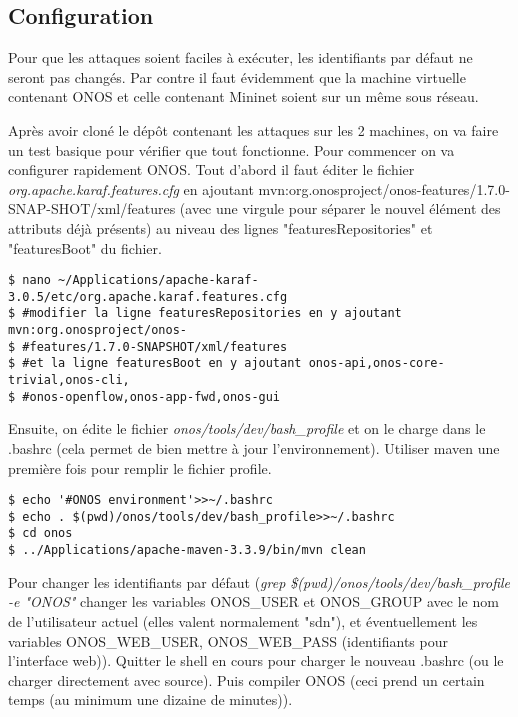 \subsection{Configuration}

Pour que les attaques soient faciles à exécuter, les identifiants par défaut ne seront pas changés. Par contre il faut évidemment que la machine virtuelle contenant ONOS et celle contenant Mininet soient sur un même sous réseau.

Après avoir cloné le dépôt contenant les attaques sur les 2 machines, on va faire un test basique pour vérifier que tout fonctionne. Pour commencer on va configurer rapidement ONOS. Tout d'abord il faut éditer le fichier \textit{org.apache.karaf.features.cfg} en ajoutant mvn:org.onosproject/onos-features/1.7.0-SNAP-SHOT/xml/features (avec une virgule pour séparer le nouvel élément des attributs déjà présents) au niveau des lignes "featuresRepositories" et "featuresBoot" du fichier.

\begin{verbatim}
$ nano ~/Applications/apache-karaf-3.0.5/etc/org.apache.karaf.features.cfg
$ #modifier la ligne featuresRepositories en y ajoutant mvn:org.onosproject/onos-
$ #features/1.7.0-SNAPSHOT/xml/features
$ #et la ligne featuresBoot en y ajoutant onos-api,onos-core-trivial,onos-cli,
$ #onos-openflow,onos-app-fwd,onos-gui
\end{verbatim}

Ensuite, on édite le fichier \textit{onos/tools/dev/bash\_profile} et on le charge dans le .bashrc (cela permet de bien mettre à jour l'environnement). Utiliser maven une première fois pour remplir le fichier profile.

\begin{verbatim}
$ echo '#ONOS environment'>>~/.bashrc
$ echo . $(pwd)/onos/tools/dev/bash_profile>>~/.bashrc
$ cd onos
$ ../Applications/apache-maven-3.3.9/bin/mvn clean
\end{verbatim}

Pour changer les identifiants par défaut (\textit{grep \$(pwd)/onos/tools/dev/bash\_profile -e "ONOS"} changer les variables ONOS\_USER et ONOS\_GROUP avec le nom de l'utilisateur actuel (elles valent normalement "sdn"), et éventuellement les variables ONOS\_WEB\_USER, ONOS\_WEB\_PASS (identifiants pour l'interface web)).
Quitter le shell en cours pour charger le nouveau .bashrc (ou le charger directement avec source).
Puis compiler ONOS (ceci prend un certain temps (au minimum une dizaine de minutes)).

